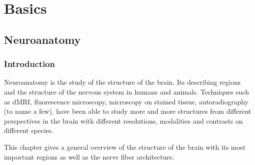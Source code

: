 \newpage\null\thispagestyle{empty}\newpage
\clearpage{\thispagestyle{empty}\cleardoublepage}
\part{Basics}
\parttoc
% 
% 
% 
\cleardoublepage
\setcounter{chapter}{1}
\chapter{Neuroanatomy}
\label{chap:neuro}
%
%
%
\section{Introduction}
%
Neuroanatomy is the study of the structure of the brain.
Its describing regions and the structure of the nervous system in humans and animals.
Techniques such as \ac{dMRI}, fluorescence microscopy, microscopy on stained tissue, autoradiography (to name a few), have been able to study more and more structures from different perspectives in the brain with different resolutions, modalities and contrasts on different species.
% 
\par
%
This chapter gives a general overview of the structure of the brain with its most important regions as well as the nerve fiber architecture.
% 
%
% 
% 
% 
%
